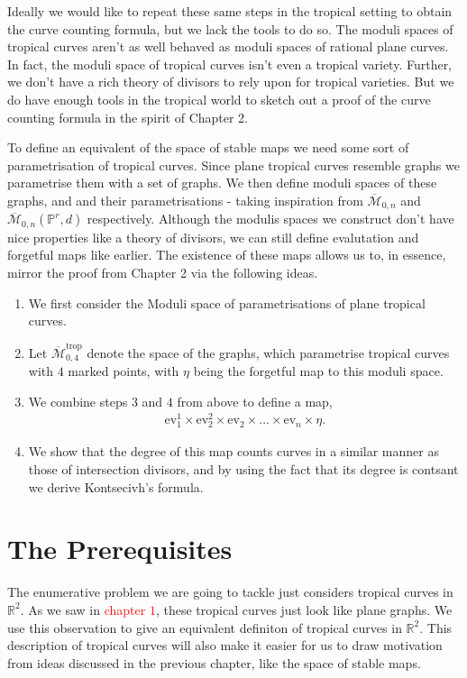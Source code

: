 Ideally we would like to repeat these same steps in the tropical setting to obtain the curve counting formula, but we lack the tools to do so.
The moduli spaces of tropical curves aren't as well behaved as moduli spaces of rational plane curves.
In fact, the moduli space of tropical curves isn't even a tropical variety.
Further, we don't have a rich theory of divisors to rely upon for tropical varieties. 
But we do have enough tools in the tropical world to sketch out a proof of the curve counting formula in the spirit of Chapter 2.
\par To define an equivalent of the space of stable maps we need some sort of parametrisation of tropical curves. 
Since plane tropical curves resemble graphs we parametrise them with a set of graphs.
We then define moduli spaces of these graphs, and and their parametrisations - taking inspiration from $\overline{\mathcal{M}}_{0,n}$ and $\overline{\mathcal{M}}_{0,n}(\mathbb{P}^{r},d)$ respectively.
Although the modulis spaces we construct don't have nice properties like a theory of divisors, we can still define evalutation and forgetful maps like earlier.
The existence of these maps allows us to, in essence, mirror the proof from Chapter 2 via the following ideas.
\begin{enumerate}
    \item We first consider the Moduli space of parametrisations of plane tropical curves.
    \item Let $\overline{\mathcal{M}}_{0,4}^{\text{trop}}$ denote the space of the graphs, which parametrise tropical curves with $4$ marked points, with $\eta$ being the forgetful map to this moduli space.
    \item We combine steps $3$ and $4$ from above to define a map,
        \begin{align*}
            \text{ev}_{1}^{1} \times \text{ev}_{2}^{2} \times \text{ev}_{2} \times \dots \times \text{ev}_{n} \times \eta.
        \end{align*}
    \item We show that the degree of this map counts curves in a similar manner as those of intersection divisors, and by using the fact that its degree is contsant we derive Kontsecivh's formula.
\end{enumerate}

\section{The Prerequisites}
The enumerative problem we are going to tackle just considers tropical curves in $\mathbb{R}^{2}$.
As we saw in \textcolor{red}{chapter $1$}, these tropical curves just look like plane graphs.
We use this observation to give an equivalent definiton of tropical curves in $\mathbb{R}^{2}$.
This description of tropical curves will also make it easier for us to draw motivation from ideas discussed in the previous chapter, like the space of stable maps.

